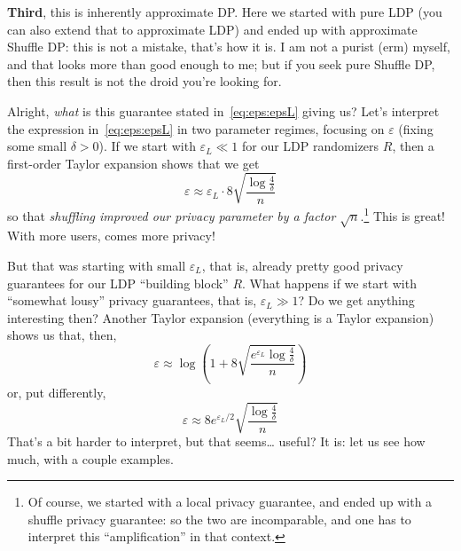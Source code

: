 \documentclass[11pt]{article}
\begin{document}
\textbf{Third}, this is inherently approximate DP. Here we started with pure LDP (you can also extend that to approximate LDP) and ended up with approximate Shuffle DP: this is not a mistake, that's how it is. I am not a purist (erm) myself, and that looks more than good enough to me; but if you seek pure Shuffle DP, then this result is not the droid you're looking for.\medskip 

Alright, \emph{what} is this guarantee stated in~\eqref{eq:eps:epsL} giving us? Let's interpret the expression in~\eqref{eq:eps:epsL} in two parameter regimes, focusing on $\varepsilon$ (fixing some small $\delta>0$). If we start with $\varepsilon_{L} \ll 1$ for our LDP randomizers $R$, then a first-order Taylor expansion shows that we get
\begin{equation}
		\varepsilon \approx \varepsilon_{L}\cdot 8\sqrt{\frac{\log\frac{4}{\delta}}{n}}
\end{equation}
so that \emph{shuffling improved our privacy parameter by a factor $\sqrt{n}$}.\footnote{Of course, we started with a local privacy guarantee, and ended up with a shuffle privacy guarantee: so the two are incomparable, and one has to interpret this ``amplification'' in that context.} 
This is great! With more users, comes more privacy!

But that was starting with small $\varepsilon_{L}$, that is, already pretty good privacy guarantees for our LDP ``building block'' $R$. What happens if we start with ``somewhat lousy'' privacy guarantees, that is, $\varepsilon_{L} \gg 1$? Do we get anything interesting then?
Another Taylor expansion (everything is a Taylor expansion) shows us that, then,
\begin{equation}
	\label{eq:epsL:ll:one}
		\varepsilon \approx \log\!\left( 1+ 8\sqrt{\frac{e^{\varepsilon_{L}}\log\frac{4}{\delta}}{n}}\right)
\end{equation}
or, put differently,
\begin{equation}
	\label{eq:epsL:gg:one}
		\varepsilon \approx 8e^{\varepsilon_{L}/2}\sqrt{\frac{\log\frac{4}{\delta}}{n}}
\end{equation}
That's a bit harder to interpret, but that seems\dots{} useful? It is: let us see how much, with a couple examples.
\end{document}

